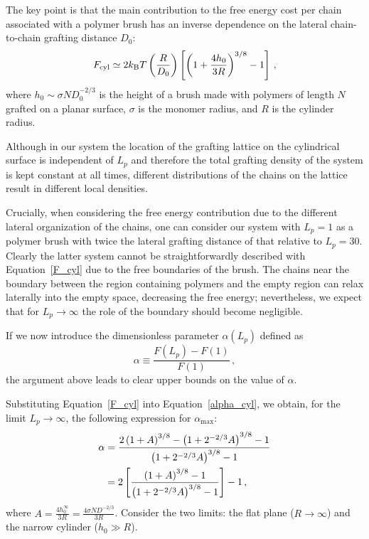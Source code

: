 The key point is that the main contribution to the free energy cost per chain associated with a polymer brush has an inverse dependence on the lateral chain-to-chain grafting distance $D_0$: 
\begin{equation}
F_{\rm cyl}\simeq 2 k_{\rm B}T \left (\frac{R}{D_0}\right )\left [\left (1+\frac{4h_0}{3R}\right )^{3/8}-1\right ] \,,
\label{F_cyl}
\end{equation} 
where $h_0\sim \sigma N D_0^{-2/3}$ is the height of a brush made with polymers of length $N$ grafted on a planar surface, $\sigma$ is the monomer radius, and $R$ is the cylinder radius.

Although in our system the location of the grafting lattice on the cylindrical surface 
is independent of $L_p$ and  therefore the total grafting density of the system is kept constant at all times, 
different distributions of the chains on the lattice result in different local densities. 

Crucially, when considering the free energy contribution due to the different lateral organization of the chains, one can consider our system with $L_p=1$ as a polymer brush with twice the lateral grafting distance of that relative to $L_p=30$. Clearly the latter system cannot be straightforwardly described with Equation~\ref{F_cyl} due to the free boundaries of the brush.
The chains near the boundary between the region containing polymers and the empty region can relax laterally into the empty space, decreasing the free energy; nevertheless, we expect that for $L_p\rightarrow\infty$ 
the role of the boundary should become negligible.

If we now introduce the dimensionless parameter
$\alpha (L_p)$ defined as
\begin{equation}
\alpha\equiv\frac{F(L_p)-F(1)}{F(1)} \,,
\label{alpha_cyl}
\end{equation}
the argument above leads to clear  upper bounds on the value of $\alpha$.

Substituting Equation~\ref{F_cyl} into Equation~\ref{alpha_cyl}, we obtain, for the limit $L_p \rightarrow \infty$, the following expression for $\alpha_{\textrm {max}}$:
\begin{align}
	\alpha &= \frac{2\left(1 + A\right)^{3/8} - \left(1 + 2^{-2/3}A\right)^{3/8} - 1}{\left(1 + 2^{-2/3} A\right)^{3/8} - 1} \notag\\
	&= 2\left[\frac{\left(1 + A\right)^{3/8} - 1}{\left(1 + 2^{-2/3}A\right)^{3/8} - 1}\right] - 1 \,,
	\label{alphamax}
\end{align}
where $A = \frac{4 h_0^{\infty}}{3 R} = \frac{4 \sigma N D^{-2/3}}{3 R}$.
Consider the two limits: the flat plane ($R \rightarrow \infty$) and the narrow cylinder ($h_0 \gg R$).


